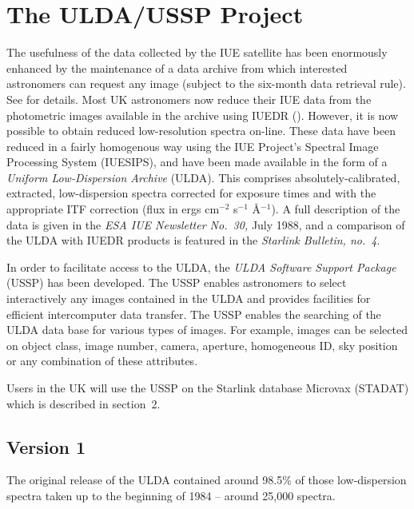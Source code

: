 \documentclass[11pt,nolof,noabs]{starlink}
\begin{document}
\scfrontmatter

\newpage
\section{The ULDA/USSP Project}

The usefulness of the data collected by the IUE satellite
has been enormously enhanced by the maintenance of a data archive
from which interested astronomers can request any image (subject
to the six-month data retrieval rule). See  for details.
Most UK astronomers now reduce their IUE data from the photometric
images available in the archive using IUEDR ().   However,
it is now possible to obtain reduced low-resolution spectra on-line.
These data have been reduced in a fairly
homogenous way using the IUE Project's Spectral Image Processing System
(IUESIPS),
and have been made available in the form of a \textit{Uniform Low-Dispersion
Archive} (ULDA).
This comprises absolutely-calibrated,  extracted, low-dispersion
spectra corrected for exposure times and with the appropriate  ITF correction
(flux in ergs cm$^{-2}$  s$^{-1}$ {\AA}$^{-1}$).
A full description of the data is given in the \textit{ESA IUE Newsletter No.~30,}
July 1988,
and a comparison of the ULDA with IUEDR products is featured in
the \textit{Starlink Bulletin, no.~4}.

In order to facilitate access to the ULDA, the \textit{ULDA Software Support
Package} (USSP) has been developed.
The USSP enables astronomers to select interactively
any images contained in the ULDA and provides facilities for efficient
intercomputer data transfer.
The USSP enables the searching of the ULDA
data base for various types of images.
For example, images can be selected on object class, image number, camera,
aperture,  homogeneous ID,
sky position or any combination of these attributes.

Users in the UK will use the USSP on the Starlink database
Microvax (STADAT) which is described in section~2.

\subsection {Version 1}

The original release of the ULDA contained around 98.5\% of those
low-dispersion spectra taken up to the beginning of 1984 -- around
25,000 spectra.
\end{document}
